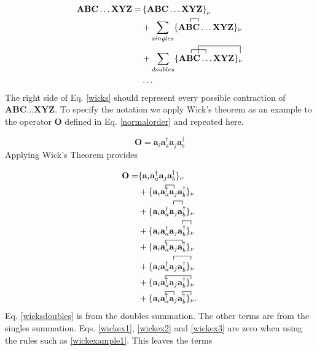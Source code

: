 \documentclass[a4paper,norsk,11pt,twoside]{report}
\begin{document}
\begin{align}
\textbf{A} \textbf{B} \textbf{C} \dots \textbf{X} \textbf{Y} \textbf{Z} = & \left\{\textbf{A} \textbf{B} \textbf{C} \dots \textbf{X} \textbf{Y} \textbf{Z} \right\}_{\nu} \label{wicks} \\
& + \sum_{singles} \{
\contraction{}{\textbf{A}}{}{\textbf{B}}
\textbf{A}\textbf{B}
\textbf{C} \dots \textbf{X} \textbf{Y} \textbf{Z}
\}_{\nu} \nonumber \\
& + \sum_{doubles} \{
\contraction{}{\textbf{A}}{\textbf{B}}{\textbf{C}}
\contraction[2ex]{\textbf{A}}{\textbf{B}}{\textbf{C} \dots \textbf{X} \textbf{Y}}{\textbf{Z}}
\textbf{A} \textbf{B} \textbf{C} \dots \textbf{X} \textbf{Y} \textbf{Z} 
\}_{\nu} \nonumber \\
& \dots \nonumber
\end{align}
The right side of Eq. \eqref{wicks} should represent every possible contraction of $\textbf{A} \textbf{B} \textbf{C} \dots \textbf{X} \textbf{Y} \textbf{Z}$. To specify the notation we apply Wick's theorem as an example to the operator $\textbf{O}$ defined in Eq. \eqref{normalorder} and repeated here.

\begin{equation}
\textbf{O} = \textbf{a}_i \textbf{a}^{\dag}_a \textbf{a}_j \textbf{a}^{\dag}_b \nonumber
\end{equation}
Applying Wick's Theorem provides

\begin{align}
\textbf{O} = & 
\{
\textbf{a}_i \textbf{a}^{\dag}_a \textbf{a}_j \textbf{a}^{\dag}_b
\}_{\nu} \\ &
+ \{
\contraction{}{\textbf{a}_i}{}{\textbf{a}^{\dag}_a}
\textbf{a}_i \textbf{a}^{\dag}_a
\textbf{a}_j \textbf{a}^{\dag}_b
\}_{\nu} \\ &
+ \{
\textbf{a}_i
\contraction{}{\textbf{a}^{\dag}_a}{}{\textbf{a}_j}
\textbf{a}^{\dag}_a \textbf{a}_j
\textbf{a}^{\dag}_b
\}_{\nu} \label{wickex1} \\ &
+ \{
\textbf{a}_i \textbf{a}^{\dag}_a
\contraction{}{\textbf{a}^j}{}{\textbf{a}^{\dag}_b}
\textbf{a}_j \textbf{a}^{\dag}_b
\}_{\nu} \\ &
+ \{
\contraction{}{\textbf{a}_i}{\textbf{a}^{\dag}_a}{\textbf{a}_j}
\textbf{a}_i \textbf{a}^{\dag}_a \textbf{a}_j
\textbf{a}^{\dag}_b
\}_{\nu} \label{wickex2} \\ &
+ \{
\textbf{a}_i
\contraction{}{\textbf{a}^{\dag}_a}{\textbf{a}_j}{\textbf{a}^{\dag}_b}
\textbf{a}^{\dag}_a \textbf{a}_j \textbf{a}^{\dag}_b
\}_{\nu} \label{wickex3} \\ &
+ \{
\contraction{}{\textbf{a}_i}{\textbf{a}^{\dag}_a \textbf{a}_j}{\textbf{a}^{\dag}_b}
\textbf{a}_i \textbf{a}^{\dag}_a \textbf{a}_j \textbf{a}^{\dag}_b
\}_{\nu} \label{wickex4} \\ &
+ \{
\contraction{}{\textbf{a}_i}{}{\textbf{a}^{\dag}_a}
\textbf{a}_i \textbf{a}^{\dag}_a 
\contraction{}{\textbf{a}_j}{}{\textbf{a}^{\dag}_b}
\textbf{a}_j \textbf{a}^{\dag}_b
\}_{\nu} . \label{wicksdoubles}
\end{align}
Eq. \eqref{wicksdoubles} is from the doubles summation. The other terms are from the singles summation. Eqs. \eqref{wickex1}, \eqref{wickex2} and \eqref{wickex3} are zero when using the rules such as \eqref{wickexample1}. This leaves the terms
\end{document}
